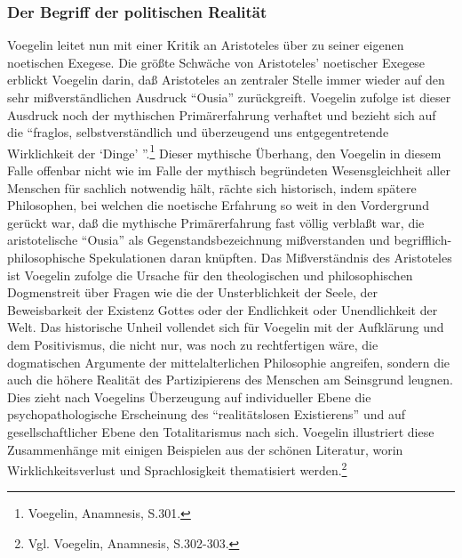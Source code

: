 \subsubsection{Der Begriff der politischen Realität}
 
Voegelin leitet nun mit einer Kritik an Aristoteles über zu seiner eigenen
noetischen Exegese. Die größte Schwäche von Aristoteles' noetischer Exegese
erblickt Voegelin darin, daß Aristoteles an zentraler Stelle immer wieder auf
den sehr mißverständlichen Ausdruck "`Ousia"' zurückgreift. Voegelin zufolge
ist dieser Ausdruck noch der mythischen Primärerfahrung verhaftet und bezieht
sich auf die "`fraglos, selbstverständlich und überzeugend uns
entgegentretende Wirklichkeit der `Dinge' "'.\footnote{Voegelin, Anamnesis,
  S.301.} Dieser mythische Überhang, den Voegelin in diesem Falle offenbar
nicht wie im Falle der mythisch begründeten Wesensgleichheit aller Menschen für
sachlich notwendig hält, rächte sich historisch, indem spätere Philosophen,
bei welchen die noetische Erfahrung so weit in den Vordergrund gerückt war,
daß die mythische Primärerfahrung fast völlig verblaßt war, die aristotelische
"`Ousia"' als Gegenstandsbezeichnung mißverstanden und
begrifflich-philosophische Spekulationen daran knüpften. Das Mißverständnis
des Aristoteles ist Voegelin zufolge die Ursache für den theologischen und
philosophischen Dogmenstreit über Fragen wie die der Unsterblichkeit der
Seele, der Beweisbarkeit der Existenz Gottes oder der Endlichkeit oder
Unendlichkeit der Welt. Das historische Unheil vollendet sich für Voegelin mit
der Aufklärung und dem Positivismus, die nicht nur, was noch zu rechtfertigen
wäre, die dogmatischen Argumente der mittelalterlichen Philosophie angreifen,
sondern die auch die höhere Realität des Partizipierens des Menschen am
Seinsgrund leugnen. Dies zieht nach Voegelins Überzeugung auf individueller
Ebene die psychopathologische Erscheinung des "`realitätslosen Existierens"'
und auf gesellschaftlicher Ebene den Totalitarismus nach sich. Voegelin
illustriert diese Zusammenhänge mit einigen Beispielen aus der schönen
Literatur, worin Wirklichkeitsverlust und Sprachlosigkeit thematisiert
werden.\footnote{Vgl. Voegelin, Anamnesis, S.302-303.}

